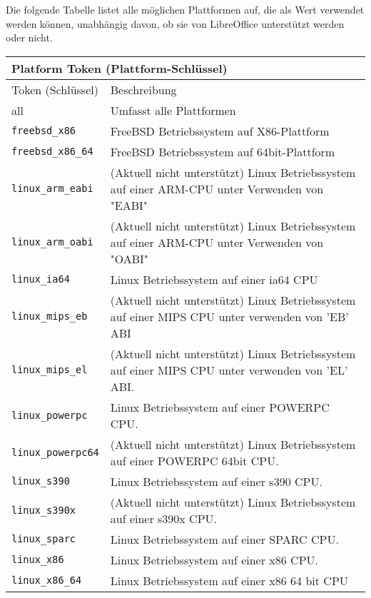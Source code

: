 \documentclass[a4paper,10pt,pagesize,titlepage]{scrbook}
\begin{document}
Die folgende Tabelle listet alle möglichen Plattformen auf, die als Wert verwendet werden können, unabhängig davon, ob sie von LibreOffice unterstützt werden oder nicht.\linebreak


\begin{tabular}{ |p{3cm}|p{9cm} | }
	
	\multicolumn{2}{l}{\textbf{Platform Token (Plattform-Schlüssel)}}\\
	\toprule
	\rowcolor{hellgrau}
	Token (Schlüssel)& Beschreibung\\
	\hline
	all   & Umfasst alle Plattformen\\
	\hline
    \verb|freebsd_x86|& FreeBSD Betriebssystem auf X86-Plattform\\
    \hline
    \verb|freebsd_x86_64|& FreeBSD Betriebssystem auf 64bit-Plattform\\
    \hline
    \verb|linux_arm_eabi|& (Aktuell nicht unterstützt) Linux Betriebssystem auf einer ARM-CPU unter Verwenden von "EABI"\\
    \hline
    \verb|linux_arm_oabi|& (Aktuell nicht unterstützt) Linux Betriebssystem auf einer ARM-CPU unter Verwenden von "OABI"\\
    \hline
    \verb|linux_ia64| &	Linux Betriebssystem auf einer ia64 CPU\\
    \hline
    \verb|linux_mips_eb| &	(Aktuell nicht unterstützt) Linux Betriebssystem auf einer MIPS CPU unter verwenden von 'EB' ABI\\
    \hline
    \verb|linux_mips_el| &	(Aktuell nicht unterstützt) Linux Betriebssystem auf einer MIPS CPU unter verwenden von 'EL' ABI.\\
    \hline
    \verb|linux_powerpc| &	Linux Betriebssystem auf einer POWERPC CPU.\\
    \hline
    \verb|linux_powerpc64| & (Aktuell nicht unterstützt) Linux Betriebssystem auf einer POWERPC 64bit CPU.\\
    \hline
    \verb|linux_s390| &	Linux Betriebssystem auf einer s390 CPU.\\
    \hline
    \verb|linux_s390x| & (Aktuell nicht unterstützt) Linux Betriebssystem auf einer s390x CPU.\\
    \hline
    \verb|linux_sparc| & Linux Betriebssystem auf einer SPARC CPU.\\
    \hline
    \verb|linux_x86| &	Linux Betriebssystem auf einer x86 CPU.\\
    \hline
    \verb|linux_x86_64| & Linux Betriebssystem auf einer x86 64 bit CPU\\

\end{tabular}
\end{document}
